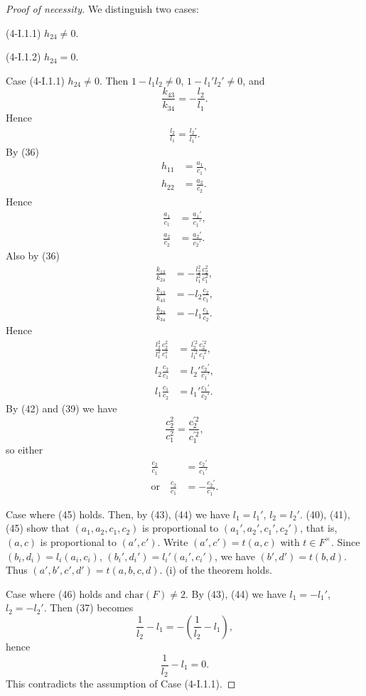 \documentclass{article}
\begin{document}
\begin{proof}[Proof of necessity]
We distinguish two cases: 

(4-I.1.1) $h_{24}\ne 0$.

(4-I.1.2) $h_{24}=0$.


Case (4-I.1.1) $h_{24}\ne 0$. Then $1-l_1l_2\ne 0$,
$1-l_1'l_2'\ne 0$, and
$$
\frac{k_{43}}{k_{34}}=-\frac{l_2}{l_1}.
$$
Hence
\begin{align*}
\frac{l_2}{l_1}=\frac{l_2'}{l_1'}.\tag{39}
\end{align*}
By (36)
\begin{align*}
h_{11}&=\frac{a_1}{c_1},\\
h_{22}&=\frac{a_2}{c_2}.
\end{align*}
Hence
\begin{align*}
\frac{a_1}{c_1}&=\frac{a_1'}{c_1'},\tag{40}\\
\frac{a_2}{c_2}&=\frac{a_2'}{c_2'}.\tag{41}
\end{align*}
Also by (36)
\begin{align*}
\frac{k_{13}}{k_{24}}&=-\frac{l_2^2}{l_1^2}\frac{c_2^2}{c_1^2},\\
\frac{k_{13}}{k_{43}}&=-l_2 \frac{c_2}{c_1},\\
\frac{k_{24}}{k_{34}}&=-l_1 \frac{c_1}{c_2}.
\end{align*}
Hence
\begin{align*}
\frac{l_2^2}{l_1^2}\frac{c_2^2}{c_1^2}&=\frac{l_2^{\prime2}}{l_1^{\prime2}}\frac{c_2^{\prime2}}{c_1^{\prime2}},\tag{42}\\
l_2 \frac{c_2}{c_1}&=l_2' \frac{c_2'}{c_1'},\tag{43}\\
l_1 \frac{c_1}{c_2}&=l_1' \frac{c_1'}{c_2'}.\tag{44}
\end{align*}
By (42) and (39) we have
$$
\frac{c_2^2}{c_1^2}=\frac{c_2^{\prime2}}{c_1^{\prime2}},
$$
so either
\begin{align*}
\frac{c_2}{c_1}&=\frac{c_2'}{c_1'}\tag{45}\\
\text{or}\quad\frac{c_2}{c_1}&=-\frac{c_2'}{c_1'}.\tag{46}
\end{align*}

Case where  (45) holds.
Then, by (43), (44) we have
$l_1=l_1'$, $l_2=l_2'$. 
(40), (41), (45) show that
$(a_1,a_2,c_1,c_2)$ is proportional to $(a_1',a_2',c_1',c_2')$, that is, 
$(a,c)$ is proportional to $(a',c')$.
Write
$(a',c')=t (a,c)$ with $t\in F^{\times}$.
Since
$(b_i,d_i)=l_i(a_i,c_i)$, $(b_i',d_i')=l_i'(a_i',c_i')$,
we have
$(b',d')=t (b,d)$.
Thus
$(a',b',c',d')=t (a,b,c,d)$.
(i) of the theorem holds.


Case where (46) holds and $\text{char}(F)\ne 2$.
By (43), (44) we have
$l_1=-l_1'$, $l_2=-l_2'$.
Then (37) becomes
$$
\frac{1}{l_2}-l_1=-(\frac{1}{l_2}-l_1),
$$
hence
$$
\frac{1}{l_2}-l_1=0.
$$
This contradicts the assumption of Case (4-I.1.1).



\end{proof}
\end{document}
